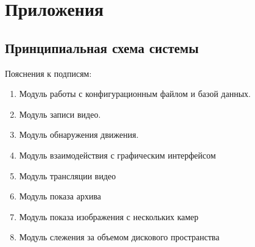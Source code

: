 \chapter*{Приложения}

\section*{Принципиальная схема системы}
Пояснения к подписям:
\smallskip
\begin{enumerate}
\item Модуль работы с конфигурационным файлом и базой данных.
\item Модуль записи видео.
\item Модуль обнаружения движения.
\item Модуль взаимодействия с графическим интерфейсом
\item Модуль трансляции видео
\item Модуль показа архива
\item Модуль показа изображения с нескольких камер
\item Модуль слежения за объемом дискового пространства
\end{enumerate}


